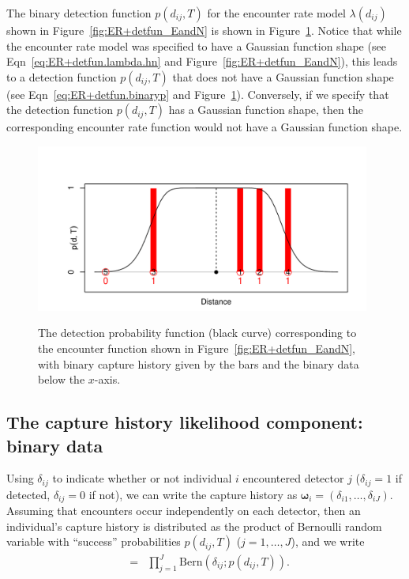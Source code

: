\documentclass[graybox,envcountchap,sectrefs]{SpringerStyleFiles/styles/svmono}\usepackage[]{graphicx}\usepackage[]{color}
\newcommand{\be}{\begin{eqnarray}}
\newcommand{\ee}{\end{eqnarray}}
\begin{document}

The binary detection function $p(d_{ij},T)$ for the encounter rate model $\lambda(d_{ij})$ shown in Figure~\ref{fig:ER+detfun_EandN} is shown in Figure~\ref{fig:ER+detfun_binp}. Notice that while the encounter rate model was specified to have a Gaussian function shape (see Eqn~\eqref{eq:ER+detfun.lambda.hn} and Figure~\ref{fig:ER+detfun_EandN}), this leads to a detection function $p(d_{ij},T)$ that does not have a Gaussian function shape (see Eqn~\eqref{eq:ER+detfun.binaryp} and Figure~\ref{fig:ER+detfun_binp}). Conversely, if we specify that the detection function $p(d_{ij},T)$ has a Gaussian function shape, then the corresponding encounter rate function would not have a Gaussian function shape.

\begin{figure}[ht]
\caption{\small The detection probability function (black curve) corresponding to the encounter function shown in Figure~\ref{fig:ER+detfun_EandN}, with binary capture history given by the bars and the binary data below the $x$-axis.}
\centering
\vspace{-24pt}
\includegraphics[width=11cm]{keepfigure/binp.pdf}
\label{fig:ER+detfun_binp}
\end{figure}


\subsection{The capture history likelihood component: binary data}
\label{subsec:ER+detfun.binarylikelihood}

Using $\delta_{ij}$ to indicate whether or not individual $i$ encountered detector $j$ ($\delta_{ij}=1$ if detected, $\delta_{ij}=0$ if not), we can write the capture history as $\bm{\omega}_i=(\delta_{i1},\ldots,\delta_{iJ})$. Assuming that encounters occur independently on each detector, then an individual's capture history is distributed as the product of Bernoulli random variable with ``success'' probabilities $p(d_{ij},T)$ ($j=1,\ldots,J$), and we write
\be
[\bm{\omega}_i|\bm{s}_i]&=&\prod_{j=1}^J\mbox{Bern}\left(\delta_{ij};p(d_{ij},T)\right).
\ee
\end{document}
